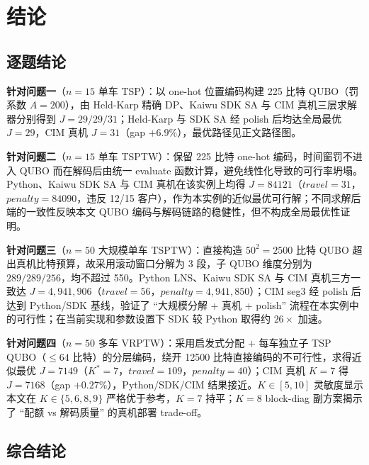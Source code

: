\documentclass[UTF8,12pt,a4paper]{ctexart}
\begin{document}
\section{结论}

\subsection{逐题结论}

\textbf{针对问题一}（$n\!=\!15$ 单车 TSP）：以 one-hot 位置编码构建 225 比特 QUBO（罚系数 $A\!=\!200$），由 Held-Karp 精确 DP、Kaiwu SDK SA 与 CIM 真机三层求解器分别得到 $J\!=\!29/29/31$；Held-Karp 与 SDK SA 经 polish 后均达全局最优 $J\!=\!29$，CIM 真机 $J\!=\!31$（gap $+6.9\%$），最优路径见正文路径图。

\textbf{针对问题二}（$n\!=\!15$ 单车 TSPTW）：保留 225 比特 one-hot 编码，时间窗罚不进入 QUBO 而在解码后由统一 evaluate 函数计算，避免线性化导致的可行率坍塌。Python、Kaiwu SDK SA 与 CIM 真机在该实例上均得 $J\!=\!84121$（$travel\!=\!31$，$penalty\!=\!84090$，违反 12/15 客户），作为本实例的近似最优可行解；不同求解后端的一致性反映本文 QUBO 编码与解码链路的稳健性，但不构成全局最优性证明。

\textbf{针对问题三}（$n\!=\!50$ 大规模单车 TSPTW）：直接构造 $50^2\!=\!2500$ 比特 QUBO 超出真机比特预算，故采用滚动窗口分解为 3 段，子 QUBO 维度分别为 $289/289/256$，均不超过 550。Python LNS、Kaiwu SDK SA 与 CIM 真机三方一致达 $J\!=\!4{,}941{,}906$（$travel\!=\!56$，$penalty\!=\!4{,}941{,}850$）；CIM seg3 经 polish 后达到 Python/SDK 基线，验证了 ``大规模分解 + 真机 + polish'' 流程在本实例中的可行性；在当前实现和参数设置下 SDK 较 Python 取得约 $26\times$ 加速。

\textbf{针对问题四}（$n\!=\!50$ 多车 VRPTW）：采用启发式分配 $+$ 每车独立子 TSP QUBO（$\le\!64$ 比特）的分层编码，绕开 12500 比特直接编码的不可行性，求得近似最优 $J\!=\!7149$（$K^{\ast}\!=\!7$，$travel\!=\!109$，$penalty\!=\!40$）；CIM 真机 $K\!=\!7$ 得 $J\!=\!7168$（gap $+0.27\%$），Python/SDK/CIM 结果接近。$K\!\in\![5,10]$ 灵敏度显示本文在 $K\!\in\!\{5,6,8,9\}$ 严格优于参考，$K\!=\!7$ 持平；$K\!=\!8$ block-diag 副方案揭示了 ``配额 vs 解码质量'' 的真机部署 trade-off。

\subsection{综合结论}
\end{document}
